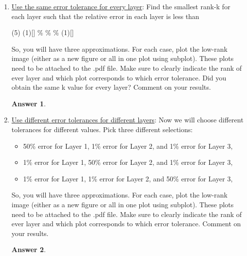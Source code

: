 \documentclass{article}
\theoremstyle{definition}
\newtheorem*{answer}{Answer}
\begin{document}
\begin{enumerate}[leftmargin=\labelsep]
\begin{enumerate}
		      \item \underline{Use the same error tolerance for every layer}: Find the smallest rank-k for each layer such that the relative error in each layer is less than

		            \begin{tasks}[label = {(\roman*)}, label-width = 1.75em, label-offset = 0em](5)
			            \task*(1)[]
			            \%
			            \%
			            \%
			            \task*(1)[]
		            \end{tasks}

		            So, you will have three approximations. For each case, plot the low-rank image (either as a new figure or all in one plot using subplot). These plots need to be attached to the .pdf file. Make sure to clearly indicate the rank of ever layer and which plot corresponds to which error tolerance. Did you obtain the same k value for every layer? Comment on your results.
		            \begin{answer}

		            \end{answer}

		      \item \underline{Use different error tolerances for different layers}: Now we will choose different tolerances for different values. Pick three different selections:
		            \begin{itemize}
			            \item 50\% error for Layer 1, 1\% error for Layer 2, and 1\% error for Layer 3,
			            \item 1\% error for Layer 1, 50\% error for Layer 2, and 1\% error for Layer 3,
			            \item 1\% error for Layer 1, 1\% error for Layer 2, and 50\% error for Layer 3,
		            \end{itemize}
		            So, you will have three approximations. For each case, plot the low-rank image (either as a new figure or all in one plot using subplot). These plots need to be attached to the .pdf file. Make sure to clearly indicate the rank of ever layer and which plot corresponds to which error tolerance. Comment on your results.
		            \begin{answer}

		            \end{answer}
	      \end{enumerate}
\end{enumerate}
\end{document}
